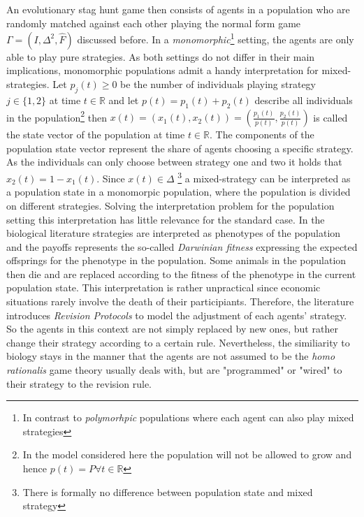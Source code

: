 \documentclass[11pt]{article}
\newcommand{\realnumb}{\mathbb{R}}
\begin{document}
An evolutionary stag hunt game then consists of agents in a population who
are randomly matched against each other playing the normal form game 
$\Gamma = (I,\Delta^2,\hat{F})$ discussed before. In a \textit{monomorphic}\footnote{In 
contrast to \textit{polymorhpic} populations where each agent can also 
play mixed strategies} setting, the agents are only able to play pure 
strategies. As both settings do not differ in their main implications, 
monomorphic populations admit a handy interpretation for mixed-strategies.
Let $p_j(t) \geq 0$ be the number of individuals playing strategy $j \in \{1,2\}$
at time $t \in \realnumb$ and let $p(t) = p_1(t) + p_2(t)$ describe all individuals 
in the population\footnote{In the model considered here the population will 
not be allowed to grow and hence $p(t) = P \forall t \in \realnumb$}
then $x(t) = \left(x_1(t),x_2(t)\right)=\left(\frac{p_1(t)}{p(t)},\frac{p_2(t)}{p(t)}\right)$ is called the state vector of the population at
time $t \in \realnumb$. The components of the population state vector represent
the share of agents choosing a specific strategy. 
As the individuals can only choose between strategy one and two it holds that 
$x_2(t) = 1-x_1(t)$. Since $x(t) \in \Delta$ \footnote{There is formally no
difference between population state and mixed strategy} a mixed-strategy can 
be interpreted as a population state in a monomorpic population, where the 
population is divided on different strategies. Solving the interpretation
problem for the population setting this interpretation has little relevance
for the standard case. 
In the biological literature\cite{maynard} strategies are interpreted as
phenotypes of the population and the payoffs represents the so-called 
\textit{Darwinian fitness} expressing the expected offsprings for the phenotype
in the population. Some animals in the population then die and are replaced
according to the fitness of the phenotype in the current population
state. 
This interpretation is rather unpractical since economic situations rarely
involve the death of their participiants. Therefore, the literature introduces
\textit{Revision Protocols} to model the adjustment of each agents' strategy.
So the agents in this context are not simply replaced by new ones, but rather
change their strategy according to a certain rule. Nevertheless, the
similiarity to biology stays in the manner that the agents are not
assumed to be the \textit{homo rationalis} game theory usually deals with, but
are "programmed" or "wired" \cite{gintis} to their strategy to the revision rule.
\end{document}
